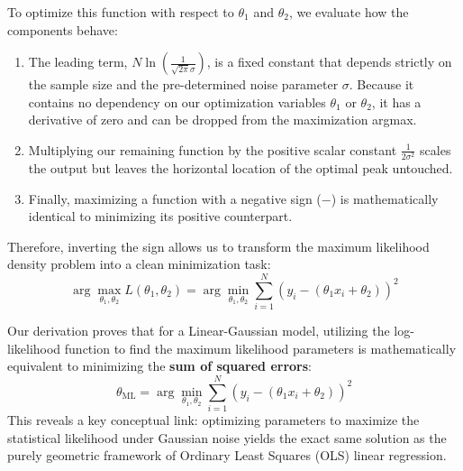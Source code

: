 To optimize this function with respect to $\theta_1$ and $\theta_2$, we evaluate how the components behave:
\begin{enumerate}
    \item The leading term, $N \ln\left(\frac{1}{\sqrt{2\pi}\sigma}\right)$, is a fixed constant that depends strictly on the sample size and the pre-determined noise parameter $\sigma$. Because it contains no dependency on our optimization variables $\theta_1$ or $\theta_2$, it has a derivative of zero and can be dropped from the maximization argmax.
    \item Multiplying our remaining function by the positive scalar constant $\frac{1}{2\sigma^2}$ scales the output but leaves the horizontal location of the optimal peak untouched. 
    \item Finally, maximizing a function with a negative sign ($-$) is mathematically identical to minimizing its positive counterpart. 
\end{enumerate}

Therefore, inverting the sign allows us to transform the maximum likelihood density problem into a clean minimization task:
\[
\arg\max_{\theta_1, \theta_2} L(\theta_1, \theta_2) = \arg\min_{\theta_1, \theta_2} \sum_{i=1}^{N} \left(y_i - (\theta_1 x_i + \theta_2)\right)^2
\]

Our derivation proves that for a Linear-Gaussian model, utilizing the log-likelihood function to find the maximum likelihood parameters is mathematically equivalent to minimizing the \textbf{sum of squared errors}:
\[
\theta_{\text{ML}} = \arg\min_{\theta_1, \theta_2} \sum_{i=1}^{N} \left(y_i - (\theta_1 x_i + \theta_2)\right)^2
\]
This reveals a key conceptual link: optimizing parameters to maximize the statistical likelihood under Gaussian noise yields the exact same solution as the purely geometric framework of Ordinary Least Squares (OLS) linear regression.
